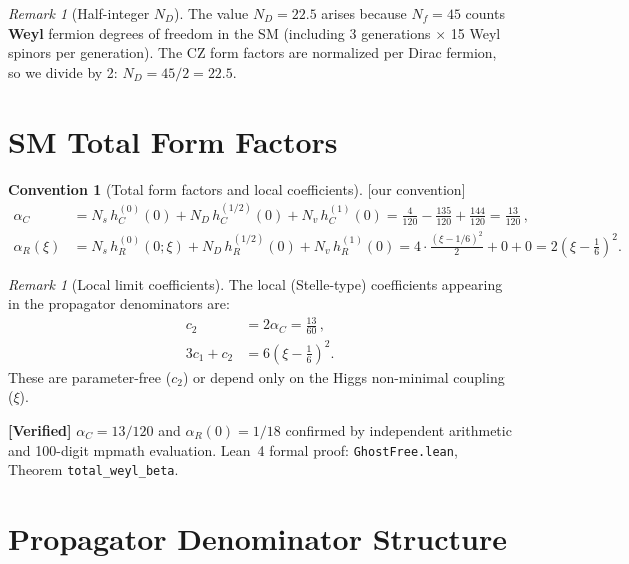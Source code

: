 \documentclass[12pt,a4paper]{article}
\theoremstyle{definition}
\newtheorem{convention}[proposition]{Convention}
\theoremstyle{remark}
\newtheorem{remark}[proposition]{Remark}
\newcommand{\oursign}{\textcolor{teal!80!black}{\textsf{[our convention]}}}
\newcommand{\verified}[1]{%
  \par\smallskip\noindent
  \colorbox{green!10}{\parbox{\dimexpr\linewidth-2\fboxsep}{%
    \textcolor{green!50!black}{\textbf{[Verified]}} #1}}%
  \par\smallskip}
\begin{document}
\begin{remark}[Half-integer $N_D$]
The value $N_D = 22.5$ arises because $N_f = 45$ counts
\textbf{Weyl} fermion degrees of freedom in the SM (including
3 generations $\times$ 15 Weyl spinors per generation).
The CZ form factors are normalized per Dirac fermion, so we
divide by 2: $N_D = 45/2 = 22.5$.
\end{remark}


\section{SM Total Form Factors}
\label{sec:sm-totals}

\begin{convention}[Total form factors and local coefficients]
\label{conv:totals}
\oursign\;
\begin{align}
  \alpha_C &= N_s\, h_C^{(0)}(0)
  + N_D\, h_C^{(1/2)}(0)
  + N_v\, h_C^{(1)}(0)
  = \frac{4}{120} - \frac{135}{120} + \frac{144}{120}
  = \frac{13}{120}\,,
  \label{eq:alpha-C}\\[4pt]
  \alpha_R(\xi) &= N_s\, h_R^{(0)}(0;\xi)
  + N_D\, h_R^{(1/2)}(0)
  + N_v\, h_R^{(1)}(0)
  = 4\cdot\frac{(\xi-1/6)^2}{2} + 0 + 0
  = 2\left(\xi-\frac{1}{6}\right)^2.
  \label{eq:alpha-R}
\end{align}
\end{convention}

\begin{remark}[Local limit coefficients]
The local (Stelle-type) coefficients appearing in the propagator
denominators are:
\begin{align}
  c_2 &= 2\alpha_C = \frac{13}{60}\,,\label{eq:c2}\\
  3c_1 + c_2 &= 6\left(\xi - \frac{1}{6}\right)^2.\label{eq:3c1c2}
\end{align}
These are parameter-free ($c_2$) or depend only on the Higgs
non-minimal coupling ($\xi$).
\end{remark}

\verified{$\alpha_C = 13/120$ and $\alpha_R(0) = 1/18$ confirmed
by independent arithmetic and 100-digit mpmath evaluation.
Lean~4 formal proof: \texttt{GhostFree.lean}, Theorem
\texttt{total\_weyl\_beta}.}


\section{Propagator Denominator Structure}
\label{sec:propagator}
\end{document}
